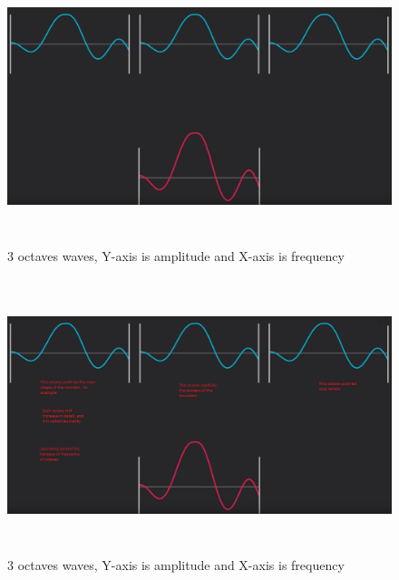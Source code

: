 \documentclass[a4paper,12pt]{book}
\begin{document}
\begin{figure}
\begin{center}
\includegraphics[height=80mm]{3noise-maps-octaves.png}
\end{center}
\caption{3 octaves waves, Y-axis is amplitude and X-axis is frequency}
\label{fig:pretty}
\end{figure}

\begin{figure}
\begin{center}
\includegraphics[height=80mm]{3noise-maps-octaves-2.png}
\end{center}
\caption{3 octaves waves, Y-axis is amplitude and X-axis is frequency}
\label{fig:pretty}
\end{figure}
\end{document}

